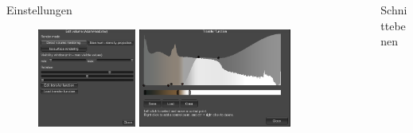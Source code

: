 \documentclass[final,hyperref={pdfpagelabels=false}]{beamer}
\begin{document}
\begin{frame}[t]
\begin{columns}[t]
\begin{column}{.465\textwidth}
\begin{block}{Einstellungen}
    \begin{figure}
    	\center
        \includegraphics[width=0.35\textwidth]{editMenu}
        \includegraphics[width=0.5475\textwidth]{transferfunction}
    \end{figure}


\end{block}


\end{column} %



\begin{column}{.025\textwidth}\end{column} %

\begin{column}{.465\textwidth}

\begin{block}{Schnittebenen}


\end{block}
\end{column}
\end{columns}
\end{frame}
\end{document}
